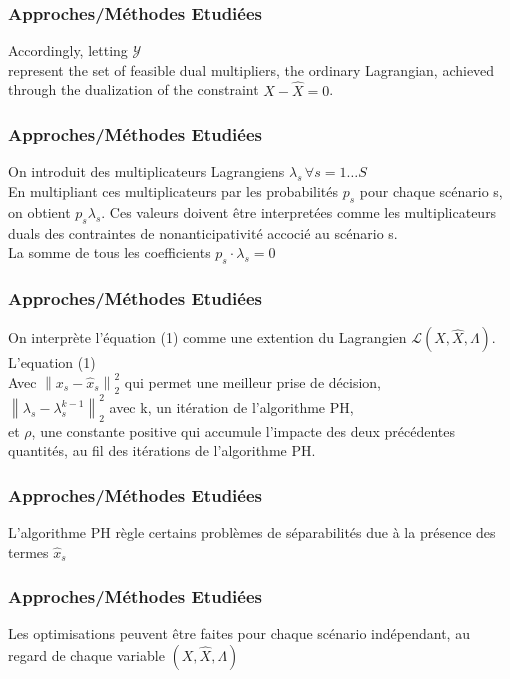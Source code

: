 \documentclass[10pt]{beamer}
\newcommand{\Lagr}{\mathcal{L}}
\newcommand\norm[1]{\left\lVert#1\right\rVert}
\begin{document}
    \begin{frame}
        \frametitle{Approches/Méthodes Etudiées}
        Accordingly, letting $\mathcal{Y}$\\ %
        represent the set of feasible dual multipliers, the ordinary Lagrangian, achieved through the dualization
of the constraint $X - \hat{X} = 0$.
    \end{frame}
    
    
    \begin{frame}
        \frametitle{Approches/Méthodes Etudiées}
        On introduit des multiplicateurs Lagrangiens $\lambda_s \, \forall s = 1 \ldots S$\\
        En multipliant ces multiplicateurs par les probabilités $p_s$ pour chaque scénario s, on obtient $p_s\lambda_s$. Ces valeurs doivent être interpretées comme les multiplicateurs duals des contraintes de nonanticipativité accocié au scénario s.\\
        La somme de tous les coefficients $p_s\cdot\lambda_s = 0$
    \end{frame}
    
    \begin{frame}
        \frametitle{Approches/Méthodes Etudiées}
        On interprète l'équation (1) comme une extention du Lagrangien $\Lagr(X, \hat{X}, \Lambda)$.\\
        L'equation (1)\\
        Avec $\norm{x_s - \hat{x}_s}^{2}_{2}$ qui permet une meilleur prise de décision,\\
       $\norm{\lambda_s - \lambda^{k-1}_{s}}^{2}_{2}$ avec k, un itération de l'algorithme PH,\\
        et $\rho$, une constante positive qui accumule l'impacte des deux précédentes quantités, au fil des itérations de l'algorithme PH.
    \end{frame}
    
    \begin{frame}
        \frametitle{Approches/Méthodes Etudiées}
        L'algorithme PH règle certains problèmes de séparabilités due à la présence des termes $\hat{x}_s$
    \end{frame}
    
    \begin{frame}
        \frametitle{Approches/Méthodes Etudiées}
        Les optimisations peuvent être faites pour chaque scénario indépendant, au regard de chaque variable $(X, \hat{X}, \Lambda)$
    \end{frame}
    
\end{document}
